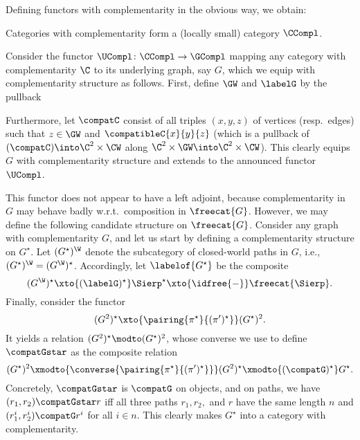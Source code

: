 \documentclass{LMCS}
\theoremstyle{plain}\newtheorem{satz}[thm]{Satz}
\begin{document}
Defining functors with complementarity in the obvious way, we obtain:
\begin{prop}
  Categories with complementarity form a (locally small) category
  $\CCompl$.
\end{prop}

Consider the functor $\UCompl \colon \CCompl \to \GCompl$
mapping any category with complementarity $\C$ to its underlying graph, say $G$, which we equip
with complementarity structure as follows. First, define
$\GW$ and $\labelG$ by the pullback
\begin{center}
\end{center}
Furthermore, let $\compatC$ consist of all triples $(x,y,z)$ of
vertices (resp.\ edges) such that $z \in \GW$ and
$\compatibleC{x}{y}{z}$ (which is a pullback of $(\compatC) \into \C^2
\times \CW$ along $\C^2 \times \GW \into \C^2 \times \CW$).  This
clearly equips $G$ with complementarity structure and extends to the
announced functor $\UCompl$.

This functor does not appear to have a left adjoint, because
complementarity in $G$ may behave badly w.r.t.\ composition in
$\freecat{G}$. However, we may define the following candidate structure on $\freecat{G}$.
Consider any graph with complementarity $G$, and
  let us start by defining a complementarity structure on $G^\star$.
  Let $(G^\star)^\W$ denote the subcategory of closed-world paths in $G$, 
  i.e., $(G^\star)^\W = (G^\W)^\star$.
  Accordingly, let $\labelof{{G^\star}}$ be the composite
  $$(G^\W)^\star \xto{(\labelG)^\star} \Sierp^\star \xto{\idfree{-}} \freecat{\Sierp}.$$
  Finally, consider the functor
  $$(G^2)^\star \xto{\pairing{\pi^\star}{(\pi')^\star}} (G^\star)^2.$$
  It yields a relation $(G^2)^\star \modto (G^\star)^2$, whose
  converse we use to define $\compatGstar$ as the composite relation
  $$(G^\star)^2 \xmodto{\converse{\pairing{\pi^\star}{(\pi')^\star}}} (G^2)^\star \xmodto{(\compatG)^\star}
  G^\star.$$ Concretely, $\compatGstar$ is $\compatG$ on objects, 
  and on paths, we have $(r_1,r_2) \compatGstar r$ iff all three
  paths $r_1, r_2,$ and $r$ have the same length $n$ and
  $(r^i_1,r^i_2) \compatG r^i$ for all $i \in n$.  This clearly makes
  $G^\star$ into a category with complementarity.
  
\end{document}
